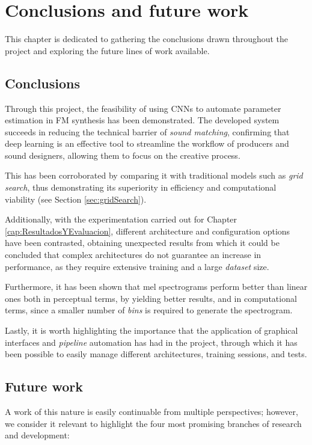 \chapter{Conclusions and future work}
\label{cap:conclusiones}

This chapter is dedicated to gathering the conclusions drawn throughout the project and exploring the future lines of work available. 

\section{Conclusions}

Through this project, the feasibility of using CNNs to automate parameter estimation in FM synthesis has been demonstrated. The developed system succeeds in reducing the technical barrier of \textit{sound matching}, confirming that deep learning is an effective tool to streamline the workflow of producers and sound designers, allowing them to focus on the creative process. 

This has been corroborated by comparing it with traditional models such as \textit{grid search}, thus demonstrating its superiority in efficiency and computational viability (see Section \ref{sec:gridSearch}).

Additionally, with the experimentation carried out for Chapter \ref{cap:ResultadosYEvaluacion}, different architecture and configuration options have been contrasted, obtaining unexpected results from which it could be concluded that complex architectures do not guarantee an increase in performance, as they require extensive training and a large \textit{dataset} size.

Furthermore, it has been shown that mel spectrograms perform better than linear ones both in perceptual terms, by yielding better results, and in computational terms, since a smaller number of \textit{bins} is required to generate the spectrogram.

Lastly, it is worth highlighting the importance that the application of graphical interfaces and \textit{pipeline} automation has had in the project, through which it has been possible to easily manage different architectures, training sessions, and tests. 

\section{Future work}

A work of this nature is easily continuable from multiple perspectives; however, we consider it relevant to highlight the four most promising branches of research and development:

